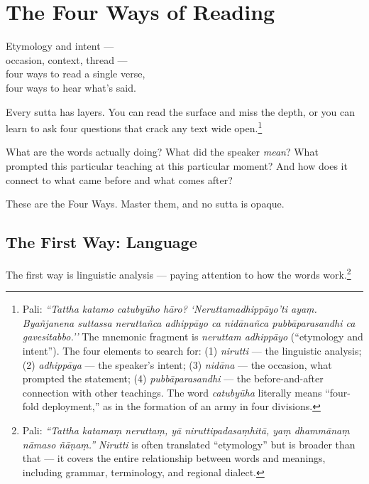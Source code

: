 \chapter{The Four Ways of Reading}
\label{ch:four-ways}

\begin{versebox}
Etymology and intent ---\\
occasion, context, thread ---\\
four ways to read a single verse,\\
four ways to hear what's said.
\end{versebox}

\noindent Every sutta has layers. You can read the surface and miss the depth, or you can learn to ask four questions that crack any text wide open.\footnote{Pali: \textit{``Tattha katamo catubyūho hāro? `Neruttamadhippāyo'ti ayaṃ. Byañjanena suttassa neruttañca adhippāyo ca nidānañca pubbāparasandhi ca gavesitabbo.''} The mnemonic fragment is \textit{neruttam adhippāyo} (``etymology and intent''). The four elements to search for: (1) \textit{nirutti} --- the linguistic analysis; (2) \textit{adhippāya} --- the speaker's intent; (3) \textit{nidāna} --- the occasion, what prompted the statement; (4) \textit{pubbāparasandhi} --- the before-and-after connection with other teachings. The word \textit{catubyūha} literally means ``four-fold deployment,'' as in the formation of an army in four divisions.}

What are the words actually doing? What did the speaker \textit{mean}? What prompted this particular teaching at this particular moment? And how does it connect to what came before and what comes after?

These are the Four Ways. Master them, and no sutta is opaque.

\section*{The First Way: Language}

The first way is linguistic analysis --- paying attention to how the words work.\footnote{Pali: \textit{``Tattha katamaṃ neruttaṃ, yā niruttipadasaṃhitā, yaṃ dhammānaṃ nāmaso ñāṇaṃ.''} \textit{Nirutti} is often translated ``etymology'' but is broader than that --- it covers the entire relationship between words and meanings, including grammar, terminology, and regional dialect.}

